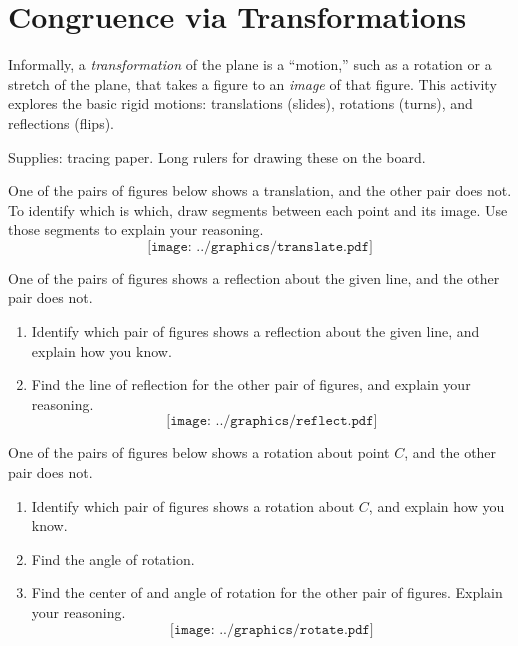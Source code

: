 \newpage

\section{Congruence via Transformations}
Informally, a \emph{transformation} of the plane is a ``motion,'' such as a rotation or a stretch of the plane, that takes a figure to an \emph{image} of that figure.  This activity explores the basic rigid motions: translations (slides), rotations (turns), and reflections (flips).  

\begin{teachingnote}
Supplies:  tracing paper.  Long rulers for drawing these on the board.  
\end{teachingnote}

\begin{prob}
One of the pairs of figures below shows a translation, and the other pair does not.  To identify which is which, draw segments between each point and its image.  Use those segments to explain your reasoning.
$$\texttt{[image: ../graphics/translate.pdf]}$$
\end{prob}

\newpage
\begin{prob}
One of the pairs of figures shows a reflection about the given line, and the other pair does not.  
\begin{enumerate}
\item Identify which pair of figures shows a reflection about the given line, and explain how you know. 
\item Find the line of reflection for the other pair of figures, and explain your reasoning.  
$$\texttt{[image: ../graphics/reflect.pdf]}$$
\end{enumerate}
\end{prob}

\newpage
\begin{prob}
One of the pairs of figures below shows a rotation about point $C$, and the other pair does not. 
\begin{enumerate}
\item Identify which pair of figures shows a rotation about $C$, and explain how you know.  
\item Find the angle of rotation.  
\item Find the center of and angle of rotation for the other pair of figures.  Explain your reasoning.  
$$\texttt{[image: ../graphics/rotate.pdf]}$$
\end{enumerate}
\end{prob}


